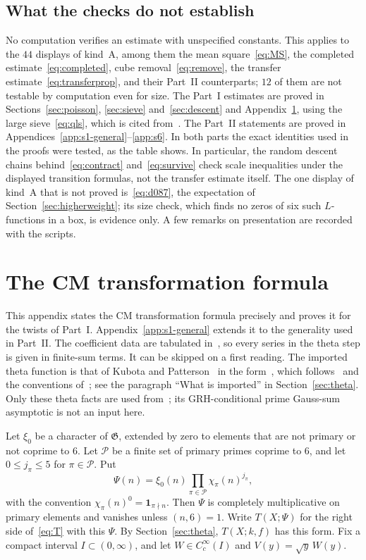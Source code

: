 \documentclass[11pt]{article}
\numberwithin{equation}{section}
\newcommand{\ind}{\mathbf1}
\begin{document}
\subsection{What the checks do not establish}\label{sec:numerics-limits}

No computation verifies an estimate with unspecified constants. This applies to the $44$ displays of kind~A,
among them the mean square~\eqref{eq:MS}, the completed estimate~\eqref{eq:completed}, cube
removal~\eqref{eq:remove}, the transfer estimate~\eqref{eq:transferprop}, and their Part~II counterparts; $12$ of
them are not testable by computation even for size. The Part~I estimates are proved in Sections~\ref{sec:poisson},
\ref{sec:sieve} and~\ref{sec:descent} and Appendix~\ref{app:reflection}, using the large sieve~\eqref{eq:qls}, which
is cited from~\cite{GL}. The Part~II statements are proved in Appendices~\ref{app:s1-general}--\ref{app:s6}. In both
parts the exact identities used in the proofs were tested, as the table shows. In particular, the random descent
chains behind~\eqref{eq:contract} and~\eqref{eq:survive} check scale inequalities under the displayed transition
formulas, not the transfer estimate itself. The one display of kind~A that is
not proved is~\eqref{eq:d087}, the expectation of Section~\ref{sec:higherweight}; its size check, which finds no
zeros of six such $L$-functions in a box, is evidence only.
A few remarks on presentation are recorded with the scripts.

\appendix
\section{The CM transformation formula}\label{app:reflection}

This appendix states the CM transformation formula precisely and proves it for the twists of Part~I.
Appendix~\ref{app:s1-general} extends it to the generality used in Part~II.
The coefficient data are tabulated in~\cite[Theorem~23]{QF}, so every
series in the theta step is given in finite-sum terms. It can be skipped on a first reading. The
imported theta function is that of Kubota and Patterson~\cite{Kub69,Pat77} in the
form~\cite[Theorem~23]{QF}, which follows~\cite[Section~5.1 and
Appendix]{DR} and the conventions of~\cite{OAI1112}; see the paragraph
``What is imported'' in Section~\ref{sec:theta}.
Only these theta facts are used from~\cite{DR}; its GRH-conditional
prime Gauss-sum asymptotic is not an input here.

Let $\xi_0$ be a character of $\mathfrak G$, extended by zero to
elements that are not primary or not coprime to $6$. Let $\mathcal P$ be
a finite set of primary primes coprime to $6$, and let $0\le j_\pi\le5$
for $\pi\in\mathcal P$. Put
\begin{equation}\label{eq:d096}
 \Psi(n)=\xi_0(n)\prod_{\pi\in\mathcal P}\chi_\pi(n)^{j_\pi},
\end{equation}
with the convention $\chi_\pi(n)^0=\ind_{\pi\nmid n}$. Then $\Psi$ is
completely multiplicative on primary elements and vanishes unless
$(n,6)=1$. Write $T(X;\Psi)$ for the right side of~\eqref{eq:T} with this
$\Psi$. By Section~\ref{sec:theta}, $T(X;k,f)$ has this form. Fix a
compact interval $I\subset(0,\infty)$, and let $W\in C_c^\infty(I)$ and
$V(y)=\sqrt y\,W(y)$.
\end{document}
